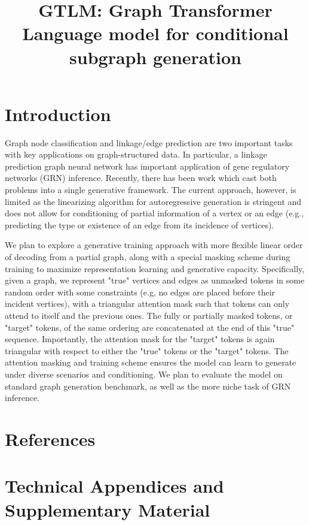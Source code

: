\documentclass{article}
\title{GTLM: Graph Transformer Language model for conditional subgraph generation}
\author{%
}
\begin{document}
\maketitle

\begin{abstract}
\end{abstract}

\section{Introduction}

Graph node classification and linkage/edge prediction are two important tasks with key applications on graph-structured data.  In particular, a linkage prediction graph neural network has important application of gene regulatory networks (GRN) inference. Recently, there has been work which cast both problems into a single generative framework.  The current approach, however, is limited as the linearizing algorithm for autoregressive generation is stringent and does not allow for conditioning of partial information of a vertex or an edge (e.g., predicting the type or existence of an edge from its incidence of vertices).

We plan to explore a generative training approach with more flexible linear order of decoding from a partial graph, along with a special masking scheme during training to maximize representation learning and generative capacity.  Specifically, given a graph, we represent "true" vertices and edges as unmasked tokens in some random order with some constraints (e.g, no edges are placed before their incident vertices), with a triangular attention mask such that tokens can only attend to itself and the previous ones.  The fully or partially masked tokens, or "target" tokens, of the same ordering are concatenated at the end of this "true" sequence. Importantly, the attention mask for the "target" tokens is again triangular with respect to either the "true" tokens or the "target" tokens.  The attention masking and training scheme ensures the model can learn to generate under diverse scenarios and conditioning. We plan to evaluate the model on standard graph generation benchmark, as well as the more niche task of GRN inference.

\section*{References}
\medskip
{
  \small
}


\appendix

\section{Technical Appendices and Supplementary Material}

\end{document}
